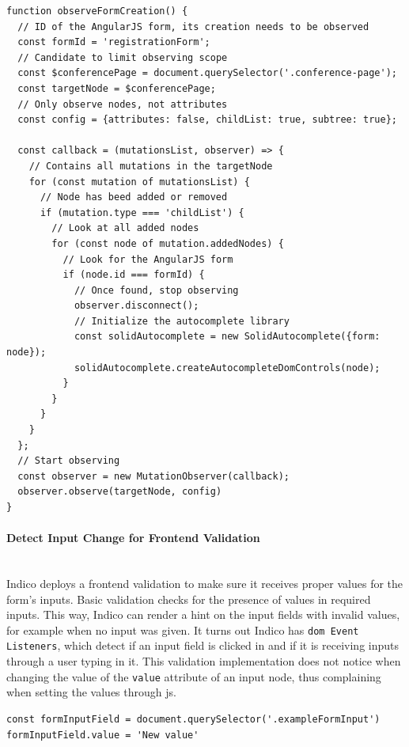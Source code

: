 \begin{lstlisting}[language=Other,columns=fullflexible, caption={Observe function in Indico}, label={lst:indico-observe}]
function observeFormCreation() {
  // ID of the AngularJS form, its creation needs to be observed
  const formId = 'registrationForm';
  // Candidate to limit observing scope
  const $conferencePage = document.querySelector('.conference-page');
  const targetNode = $conferencePage;
  // Only observe nodes, not attributes
  const config = {attributes: false, childList: true, subtree: true};

  const callback = (mutationsList, observer) => {
    // Contains all mutations in the targetNode
    for (const mutation of mutationsList) {
      // Node has beed added or removed
      if (mutation.type === 'childList') {
        // Look at all added nodes
        for (const node of mutation.addedNodes) {
          // Look for the AngularJS form
          if (node.id === formId) {
            // Once found, stop observing
            observer.disconnect();
            // Initialize the autocomplete library
            const solidAutocomplete = new SolidAutocomplete({form: node});
            solidAutocomplete.createAutocompleteDomControls(node);
          }
        }
      }
    }
  };
  // Start observing
  const observer = new MutationObserver(callback);
  observer.observe(targetNode, config)
}
\end{lstlisting}

\vspace{0.5cm}
\paragraph{Detect Input Change for Frontend Validation}\label{poc2-detect-input}\mbox{}\\

Indico deploys a frontend validation to make sure it receives proper values for the form's inputs. Basic validation checks for the presence of values in required inputs. This way, Indico can render a hint on the input fields with invalid values, for example when no input was given. It turns out Indico has \texttt{\gls{dom} Event Listeners}, which detect if an input field is clicked in and if it is receiving inputs through a user typing in it. This validation implementation does not notice when changing the value of the \texttt{value} attribute of an input node, thus complaining when setting the values through \gls{js}.

\begin{lstlisting}[language=Other,columns=fullflexible, caption={Changing the value of an input node.}, label={lst:input-change}]
const formInputField = document.querySelector('.exampleFormInput')
formInputField.value = 'New value'
\end{lstlisting}

